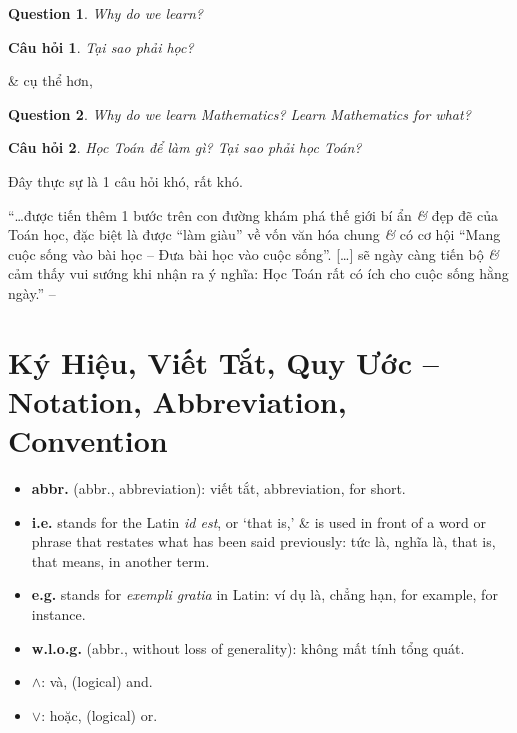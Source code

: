 \documentclass[oneside]{book}
\numberwithin{equation}{section}
\newtheorem{question}{Question}[section]
\newtheorem{cauhoi}{Câu hỏi}[section]
\begin{document}
\begin{question}
	Why do we learn?
\end{question}

\begin{cauhoi}
	Tại sao phải học?
\end{cauhoi}
\& cụ thể hơn,

\begin{question}
	Why do we learn Mathematics? Learn Mathematics for what?
\end{question}
\begin{cauhoi}
	Học Toán để làm gì? Tại sao phải học Toán?
\end{cauhoi}
Đây thực sự là 1 câu hỏi khó, rất khó.

``\ldots được tiến thêm 1 bước trên con đường khám phá thế giới bí ẩn \textit{\&} đẹp đẽ của Toán học, đặc biệt là được ``làm giàu'' về vốn văn hóa chung \textit{\&} có cơ hội ``Mang cuộc sống vào bài học -- Đưa bài học vào cuộc sống''. [\ldots] sẽ ngày càng tiến bộ \textit{\&} cảm thấy vui sướng khi nhận ra ý nghĩa: Học Toán rất có ích cho cuộc sống hằng ngày.'' -- \cite[p. 1]{Thai_Anh_Dat_Ha_Loan_Nam_Quang_Toan_6_tap_1}

\section*{Ký Hiệu, Viết Tắt, Quy Ước -- Notation, Abbreviation, Convention}
\begin{itemize}
	\item \textbf{abbr.} (abbr., abbreviation): viết tắt, abbreviation, for short.
	\item \textbf{i.e.} stands for the Latin \textit{id est}, or `that is,' \& is used in front of a word or phrase that restates what has been said previously: tức là, nghĩa là, that is, that means, in another term.
	\item \textbf{e.g.} stands for \textit{exempli gratia} in Latin: ví dụ là, chẳng hạn, for example, for instance.
	\item \textbf{w.l.o.g.} (abbr., without loss of generality): không mất tính tổng quát.
	\item $\land$: và, (logical) and.
	\item $\lor$: hoặc, (logical) or.
\end{itemize}

\end{document}
